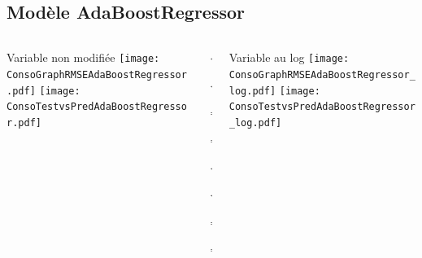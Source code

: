 \documentclass[8pt,aspectratio=169,hyperref={unicode=true}]{beamer}
\begin{document}
\subsection{Modèle AdaBoostRegressor}
\begin{frame}{\insertsubsection}
  \begin{columns}[t]
    \begin{column}{.31\textwidth}
      \centering Variable non modifiée
      \texttt{[image: ConsoGraphRMSEAdaBoostRegressor.pdf]}
      \texttt{[image: ConsoTestvsPredAdaBoostRegressor.pdf]}
    \end{column}
    \begin{column}{.38\textwidth}
      $\Longleftarrow$

      {\footnotesize
          }

      $\Longleftarrow$

      \raggedleft
      $\Longrightarrow$

      {\footnotesize
          }

      $\Longrightarrow$

      \vspace{1cm}

      \raggedright
      $\Longleftarrow$
      {\scriptsize
          }

      $\Longleftarrow$

      \raggedleft
      $\Longrightarrow$

      {\scriptsize
          
        }

      $\Longrightarrow$
    \end{column}
    \begin{column}{.31\textwidth}
      \centering Variable au log
      \texttt{[image: ConsoGraphRMSEAdaBoostRegressor\_log.pdf]}
      \texttt{[image: ConsoTestvsPredAdaBoostRegressor\_log.pdf]}
    \end{column}
  \end{columns}
\end{frame}
\end{document}
